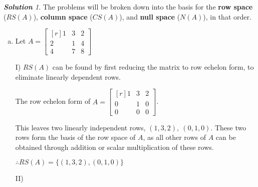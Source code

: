 \documentclass[12pt, letterpaper]{article}
\theoremstyle{remark}
\theoremstyle{remark}
\newtheorem*{solution}{\textbf{Solution}}
\begin{document}
\begin{solution}
    
    The problems will be broken down into the basis for 
    the \textbf{row space} ($RS(A)$), \textbf{column space} ($CS(A)$), and 
    \textbf{null space} ($N(A)$), in that 
    order.

	\begin{enumerate}[(a)]
        \item Let \( A =
            \begin{bmatrix*}[r]
                1 & 3 & 2 \\
                2 & 1 & 4 \\
                4 & 7 & 8
            \end{bmatrix*}
            \) 
            
            I) $RS(A)$ can be found by
            first reducing the matrix to row echelon form, to
            eliminate linearly dependent rows.

            The row echelon form of \(A = 
            \begin{bmatrix*}[r]
                1 & 3 & 2 \\
                0 & 1 & 0 \\
                0 & 0 & 0
            \end{bmatrix*}
            \).

            This leaves two linearly independent rows, \((1, 3, 2),\ (0, 1, 0)\).
            These two rows form the basis of the row space of $A$, as all other
            rows of $A$ can be obtained through addition or scalar multiplication 
            of these rows.

            \(\therefore RS(A) = \{(1, 3, 2),(0, 1, 0)\}\)
            
            II) 
        
	\end{enumerate}

\end{solution}
\end{document}
